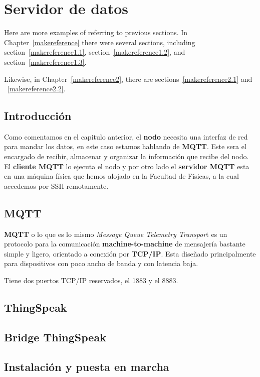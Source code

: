 \cleardoublepage

\chapter{Servidor de datos}
\label{makereference5}

Here are more examples of referring to previous sections.  In
Chapter~\ref{makereference} there were several sections, including
section~\ref{makereference1.1}, section~\ref{makereference1.2},
and section~\ref{makereference1.3}.

Likewise, in Chapter~\ref{makereference2}, there are
sections~\ref{makereference2.1} and ~\ref{makereference2.2}.

\section{Introducción}
\label{makereference5.1}
Como comentamos en el capitulo anterior, el \textbf{nodo} necesita una interfaz de red para mandar los datos, en este caso estamos hablando de \textbf{MQTT}. Este sera el encargado de recibir, almacenar y organizar la información que recibe del nodo.
El \textbf{cliente MQTT} lo ejecuta el nodo y por otro lado el \textbf{servidor MQTT} esta en una máquina física que hemos alojado en la Facultad de Físicas, a la cual accedemos por SSH remotamente.

\section{MQTT}
\label{makereference5.2}
\textbf{MQTT} o lo que es lo mismo \textit{Message Queue Telemetry Transpor}t es un protocolo para la comunicación \textbf{machine-to-machine} de mensajería bastante simple y ligero, orientado a conexión por \textbf{TCP/IP}. Esta diseñado principalmente para dispositivos con poco ancho de banda y con latencia baja. 

Tiene dos puertos TCP/IP reservados, el 1883 y el 8883.

\section{ThingSpeak}
\label{makereference5.3}

\section{Bridge ThingSpeak}
\label{makereference5.4}

\section{Instalación y puesta en marcha}
\label{makereference5.5}